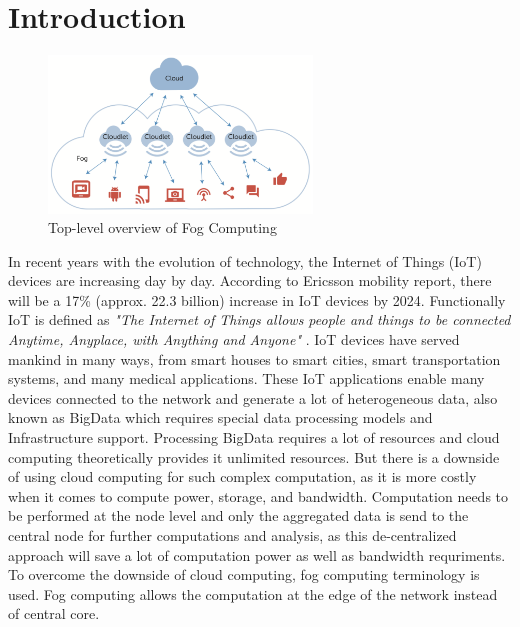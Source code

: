 \section{Introduction}
\label{sec:introduction}
\begin{figure}
  \centering
  \includegraphics[width=70mm]{figures/mlcn-fog-1.pdf}
  \caption{Top-level overview of Fog Computing\cite{Bittencourt2017}}
  \label{fig:fog-arch}
\end{figure}
In recent years with the evolution of technology, the Internet of Things (IoT) devices are increasing day by day. According to Ericsson mobility report\cite{erricssonreport}, there will be a 17\% (approx. 22.3 billion) increase in IoT devices by 2024. Functionally IoT is defined as \emph{"The Internet of Things allows people and things to be connected Anytime, Anyplace, with Anything and Anyone"} \cite{euiotdef}. IoT devices have served mankind in many ways, from smart houses to smart cities, smart transportation systems, and many medical applications. These IoT applications enable many devices connected to the network and generate a lot of heterogeneous data, also known as BigData which requires special data processing models and Infrastructure support\cite{Bittencourt2017}. Processing BigData requires a lot of resources and cloud computing theoretically provides it unlimited resources\cite{10.1145/3057266}. But there is a downside of using cloud computing for such complex computation, as it is more costly when it comes to compute power, storage, and bandwidth\cite{10.1145/3057266}. Computation needs to be performed at the node level and only the aggregated data is send to the central node for further computations and analysis, as this de-centralized approach will save a lot of computation power as well as bandwidth requriments\cite{10.1145/3057266}. To overcome the downside of cloud computing, fog computing terminology is used. Fog computing allows the computation at the edge of the network instead of central core\cite{10.1145/3057266}. \par
